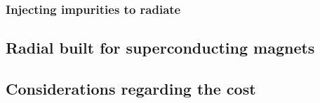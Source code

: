 \subsubsection*{Injecting impurities to radiate}


\subsection{Radial built for superconducting magnets}
\label{sec:radial_built}


\subsection{Considerations regarding the cost}
\label{sec:cost}

